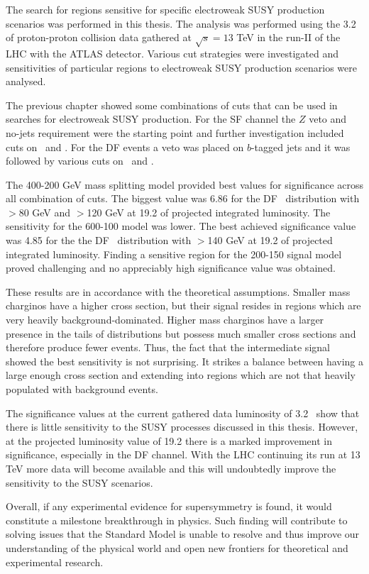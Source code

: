 The search for regions sensitive for specific electroweak SUSY production scenarios was performed in this thesis. The analysis was performed using the 3.2 \invfb of proton-proton collision data  gathered at $\sqrt{s}=13$ TeV in the run-II of the LHC with the ATLAS detector. Various cut strategies were investigated and sensitivities of particular regions to electroweak SUSY production scenarios were analysed. 

The previous chapter showed some combinations of cuts that can be used in searches for electroweak SUSY production. For the SF channel the $Z$ veto and no-jets requirement were the starting point and further investigation included cuts on \metrel \, and \mttwo. For the DF events a veto was placed on $b$-tagged jets and it was followed by various cuts on \metrel \, and \mttwo. 

The 400-200 GeV mass splitting model provided best values for significance across all combination of cuts. The biggest value was 6.86 for the DF \mttwo \, distribution  with \metrel$>$80 GeV and \mttwo$>$120 GeV at 19.2 \invfb of projected integrated luminosity.
The sensitivity for the 600-100 model was lower. The best achieved significance value was 4.85 for the the DF \mttwo \, distribution  with \mttwo$>$140 GeV at 19.2 \invfb of projected integrated luminosity. Finding a sensitive region for the 200-150 signal model proved challenging and no appreciably high significance value was obtained.

These results are in accordance with the theoretical assumptions. Smaller mass charginos have a higher cross section, but their signal resides in regions which are very heavily background-dominated. Higher mass charginos have a larger presence in the tails of distributions but possess much smaller cross sections and therefore produce fewer events. Thus, the fact that the intermediate signal showed the best sensitivity is not surprising. It strikes a balance between having a large enough cross section and extending into regions which are not that heavily populated with background events.

The significance values at the current gathered data luminosity of 3.2 \invfb \, show that there is little sensitivity to the SUSY processes discussed in this thesis. However, at the projected luminosity value of 19.2 \invfb there is a marked improvement in significance, especially in the DF channel. With the LHC continuing its run at 13 TeV more data will become available and this will undoubtedly improve the sensitivity to the SUSY scenarios. 

Overall, if any experimental evidence for supersymmetry is found, it would constitute a milestone breakthrough in physics. Such finding will contribute to solving issues that the Standard Model is unable to resolve and thus improve our understanding of the physical world and open new frontiers for theoretical and experimental research.







